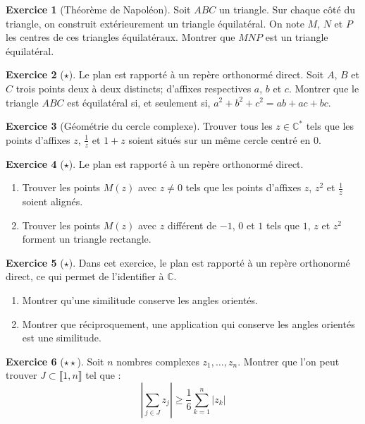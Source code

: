 \documentclass[french]{book}
\newcommand{\C}{\mathbb{C}}
\newcommand{\st}{^*}
\theoremstyle{definition}
\newtheorem{ex}{Exercice}[chapter]
\theoremstyle{theorem}
\theoremstyle{remark}
\begin{document}
\begin{ex}[Théorème de Napoléon]
	Soit $ABC$ un triangle. Sur chaque côté du triangle, on construit extérieurement un triangle équilatéral. On note $M$, $N$ et $P$ les centres de ces triangles équilatéraux. Montrer que $MNP$ est un triangle équilatéral.
\end{ex}

\begin{ex}[$\star$]
	Le plan est rapporté à un repère orthonormé direct. Soit $A$, $B$ et $C$ trois points deux à deux distincts; d'affixes respectives $a$, $b$ et $c$. Montrer que le triangle $ABC$ est équilatéral si, et seulement si, $a^2+b^2+c^2=ab+ac+bc$.
\end{ex}

\begin{ex}[Géométrie du cercle complexe]
	Trouver tous les $z \in \C\st$ tels que les points d'affixes $z$, $\frac{1}{z}$ et $1+z$ soient situés sur un même cercle centré en 0.
\end{ex}

\begin{ex}[$\star$]
	Le plan est rapporté à un repère orthonormé direct.
	\begin{enumerate}
		\item Trouver les points $M(z)$ avec $z\ne 0$ tels que les points d'affixes $z$, $z^2$ et $\displaystyle\frac{1}{z}$ soient alignés.
		\item Trouver les points $M(z)$ avec $z$ différent de $-1$, $0$ et $1$ tels que $1$, $z$ et $z^2$ forment un triangle rectangle.
	\end{enumerate}
\end{ex}

\begin{ex}[$\star$]
	Dans cet exercice, le plan est rapporté à un repère orthonormé direct, ce qui permet de l'identifier à $\C$.
	\begin{enumerate}
		\item Montrer qu'une similitude conserve les angles orientés.
		\item Montrer que réciproquement, une application qui conserve les angles orientés est une similitude.
	\end{enumerate}
\end{ex}

\begin{ex}[$\star\star$]
	Soit $n$ nombres complexes $z_1,\ldots,z_n$. Montrer que l'on peut trouver $J\subset\llbracket1,n\rrbracket$ tel que : $$\left\lvert\sum_{j\in J}z_j\right\rvert\geqslant\frac{1}{6}\sum_{k=1}^{n}\lvert z_k\rvert$$
\end{ex}
\end{document}
